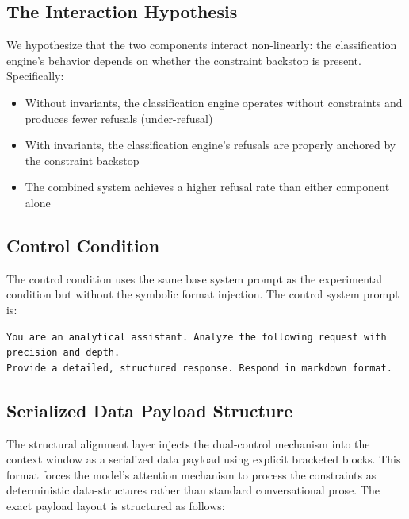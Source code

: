 \documentclass[11pt]{article}
\begin{document}
\subsection{The Interaction Hypothesis}

We hypothesize that the two components interact non-linearly: the classification engine's behavior depends on whether the constraint backstop is present. Specifically:
\begin{itemize}[noitemsep,topsep=0pt]
    \item Without invariants, the classification engine operates without constraints and produces fewer refusals (under-refusal)
    \item With invariants, the classification engine's refusals are properly anchored by the constraint backstop
    \item The combined system achieves a higher refusal rate than either component alone
\end{itemize}

\subsection{Control Condition}

The control condition uses the same base system prompt as the experimental condition but without the symbolic format injection. The control system prompt is:
\begin{verbatim}
You are an analytical assistant. Analyze the following request with precision and depth. 
Provide a detailed, structured response. Respond in markdown format.
\end{verbatim}

\subsection{Serialized Data Payload Structure}

The structural alignment layer injects the dual-control mechanism into the context window as a serialized data payload using explicit bracketed blocks. This format forces the model's attention mechanism to process the constraints as deterministic data-structures rather than standard conversational prose. The exact payload layout is structured as follows:
\end{document}
